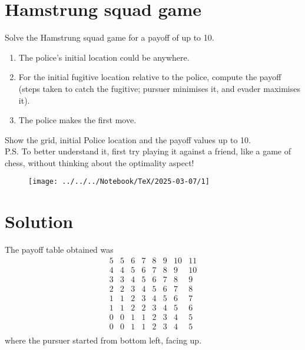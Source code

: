 \section*{Hamstrung squad game}

Solve the Hamstrung squad game for a payoff of up to 10.
\begin{enumerate}[noitemsep, topsep=0pt]
      \item The police's initial location could be anywhere.
      \item For the initial fugitive location relative to the police, compute the payoff (steps taken to catch the fugitive; pursuer minimises it, and evader maximises it).
      \item The police makes the first move.
\end{enumerate}
Show the grid, initial Police location and the payoff values up to 10. \\
P.S. To better understand it, first try playing it against a friend, like a game of chess, without thinking about the optimality aspect!

\begin{figure}[htbp]
      \centering
      \texttt{[image: ../../../Notebook/TeX/2025-03-07/1]}
\end{figure}

\clearpage
\section*{Solution}

The payoff table obtained was
\[
\begin{array}{ccccccccccc}
5 & 5 & 6 & 7 & 8 & 9 & 10 & 11 \\
4 & 4 & 5 & 6 & 7 & 8 & 9 & 10 \\
3 & 3 & 4 & 5 & 6 & 7 & 8 & 9 \\
2 & 2 & 3 & 4 & 5 & 6 & 7 & 8 \\
1 & 1 & 2 & 3 & 4 & 5 & 6 & 7 \\
1 & 1 & 2 & 2 & 3 & 4 & 5 & 6 \\
0 & 0 & 1 & 1 & 2 & 3 & 4 & 5 \\
0 & 0 & 1 & 1 & 2 & 3 & 4 & 5 \\
\end{array}
\]
where the pursuer started from bottom left, facing up.
